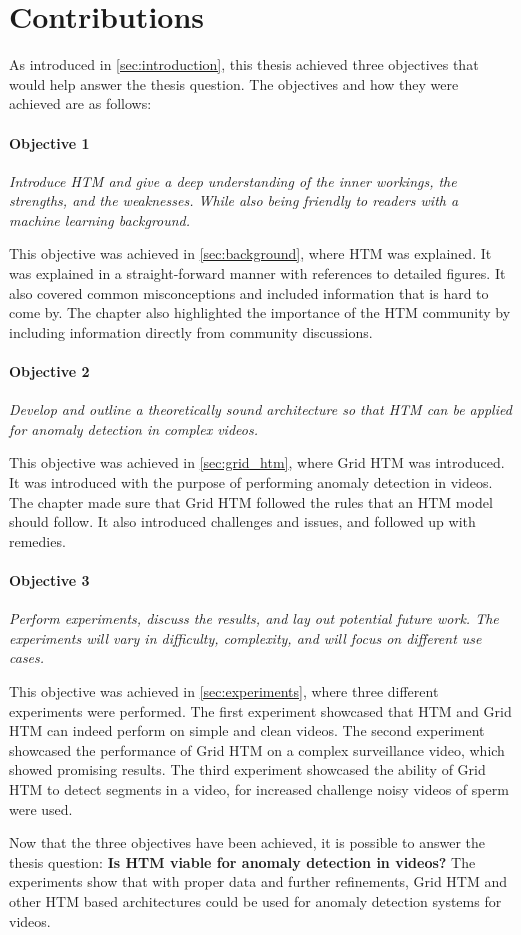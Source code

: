 \section{Contributions}
As introduced in \autoref{sec:introduction}, this thesis achieved three objectives that would help answer the thesis question. The objectives and how they were achieved are as follows:
\par
\paragraph*{Objective 1} \emph{Introduce HTM and give a deep understanding of the inner workings, the strengths, and the weaknesses. While also being friendly to readers with a machine learning background.}
\par
This objective was achieved in \autoref{sec:background}, where HTM was explained. It was explained in a straight-forward manner with references to detailed figures. It also covered common misconceptions and included information that is hard to come by. The chapter also highlighted the importance of the HTM community by including information directly from community discussions.
\paragraph*{Objective 2} \emph{Develop and outline a theoretically sound architecture so that HTM can be applied for anomaly detection in complex videos.}
\par
This objective was achieved in \autoref{sec:grid_htm}, where Grid HTM was introduced. It was introduced with the purpose of performing anomaly detection in videos. The chapter made sure that Grid HTM followed the rules that an HTM model should follow. It also introduced challenges and issues, and followed up with remedies.
\paragraph*{Objective 3} \emph{Perform experiments, discuss the results, and lay out potential future work. The experiments will vary in difficulty, complexity, and will focus on different use cases.}
\par
This objective was achieved in \autoref{sec:experiments}, where three different experiments were performed. The first experiment showcased that HTM and Grid HTM can indeed perform on simple and clean videos. The second experiment showcased the performance of Grid HTM on a complex surveillance video, which showed promising results. The third experiment showcased the ability of Grid HTM to detect segments in a video, for increased challenge noisy videos of sperm were used.
\par
Now that the three objectives have been achieved, it is possible to answer the thesis question: \textbf{Is HTM viable for anomaly detection in videos?} The experiments show that with proper data and further refinements, Grid HTM and other HTM based architectures could be used for anomaly detection systems for videos.
